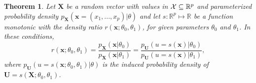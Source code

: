 \documentclass[12pt]{article}
\newcommand{\sstar}{s^*}
\numberwithin{equation}{section}
\theoremstyle{plain}
\newtheorem{theorem}{Theorem}
\begin{document}
%
%

\begin{theorem}
    \label{thm:ratio-equivalence}
    Let $\mathbf{X}$ be a random vector with values in ${\cal X} \subseteq \mathbb{R}^p$ and parameterized probability
    density $p_{\mathbf{X}}(\mathbf{x} = (x_1, ..., x_p)|\theta)$ and let
    $s : \mathbb{R}^p \mapsto \mathbb{R}$ be a function monotonic with the density ratio
    $r(\mathbf{x};\theta_0,\theta_1)$,
    for given parameters $\theta_0$ and $\theta_1$. In these conditions,
    \begin{equation}
        r(\mathbf{x};\theta_0,\theta_1) = \frac{p_\mathbf{X}(\mathbf{x}|\theta_0)}{p_\mathbf{X}(\mathbf{x}|\theta_1)} = \frac{p_\mathbf{U}(u=s(\mathbf{x})|\theta_0)}{p_\mathbf{U}(u=s(\mathbf{x})|\theta_1)},
    \end{equation}
    where $p_\mathbf{U}(u=s(\mathbf{x};\theta_0,\theta_1)|\theta)$ is the induced probability density of
    $\mathbf{U} = s(\mathbf{X};\theta_0,\theta_1)$.
\end{theorem}
\end{document}
